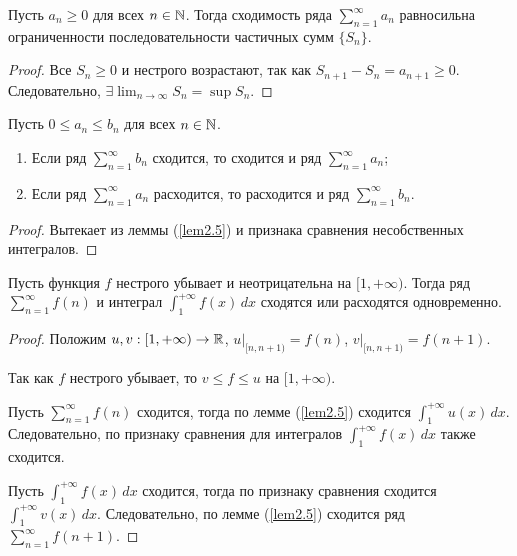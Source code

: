 \begin{lemma}
    Пусть $a_n \ge 0$ для всех $n \in \mathbb{N}$. Тогда сходимость ряда $\sum_{n = 1}^{\infty} a_n$ равносильна ограниченности последовательности частичных сумм $\{S_n\}$.

    \begin{proof}
        Все $S_n \ge 0$ и нестрого возрастают, так как $S_{n + 1} - S_n = a_{n + 1} \ge 0$. Следовательно, $\exists \lim_{n \rightarrow \infty} S_n = \sup S_n.$
    \end{proof}
\end{lemma}

\begin{theorem}
    Пусть $0 \le a_n \le b_n$ для всех $n \in \mathbb{N}$.
    \begin{enumerate}
        \item Если ряд $\sum_{n = 1}^\infty b_n$ сходится, то сходится и ряд $\sum_{n = 1}^\infty a_n$;
        \item Если ряд $\sum_{n = 1}^\infty a_n$ расходится, то расходится и ряд $\sum_{n = 1}^\infty b_n$.
    \end{enumerate}

    \begin{proof}
        Вытекает из леммы (\ref{lem2.5}) и признака сравнения несобственных интегралов.
    \end{proof}
\end{theorem}

\begin{theorem}
    \label{integral-test}
    Пусть функция $f$ нестрого убывает и неотрицательна на $[1, +\infty)$. Тогда ряд $\sum_{n = 1}^\infty f(n)$ и интеграл $\int_1^{+\infty} f(x)\, dx$ сходятся или расходятся одновременно.

    \begin{proof}
        Положим $u, v: [1, +\infty) \rightarrow \mathbb{R}$, $u\rvert_{[n, n + 1)} = f(n)$, $v\rvert_{[n, n + 1)} = f(n + 1)$.

        Так как $f$ нестрого убывает, то $v \le f \le u$ на $[1, +\infty)$.

        Пусть $\sum_{n = 1}^\infty f(n)$ сходится, тогда по лемме (\ref{lem2.5}) сходится $\int_1^{+\infty} u(x)\, dx$. Следовательно, по признаку сравнения для интегралов $\int_1^{+\infty} f(x)\, dx$ также сходится.

        Пусть $\int_1^{+\infty} f(x)\, dx$ сходится, тогда по признаку сравнения сходится $\int_1^{+\infty} v(x)\, dx$. Следовательно, по лемме (\ref{lem2.5}) сходится ряд $\sum_{n = 1}^\infty f(n + 1)$.
    \end{proof}
\end{theorem}

